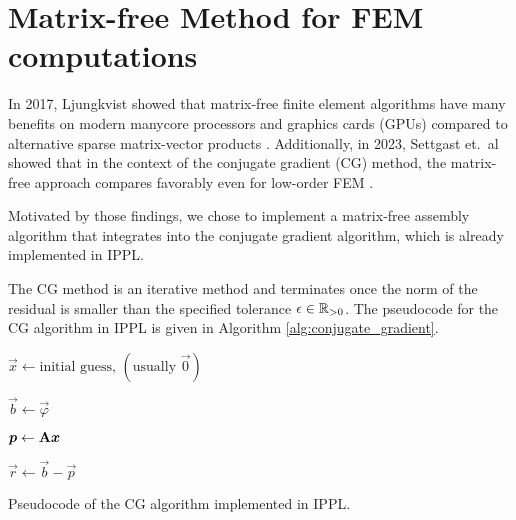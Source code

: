 
\section{Matrix-free Method for FEM computations}

\label{sec:matrix_free}

In 2017, Ljungkvist showed that matrix-free finite element algorithms
have many benefits on modern manycore processors and graphics cards (GPUs)
compared to alternative sparse matrix-vector products \cite{ljungkvist_matrix-free_2017}.
Additionally, in 2023, Settgast et.\ al showed that in the context of the
conjugate gradient (CG) method, the matrix-free approach compares favorably
even for low-order FEM \cite{settgast_performant_2023}.

Motivated by those findings, we chose to implement a matrix-free assembly algorithm that integrates
into the conjugate gradient algorithm, which is already implemented in IPPL.

The CG method is an iterative method and terminates once the norm of the residual is smaller than the specified tolerance $\epsilon \in \mathbb{R}_{>0}$.
The pseudocode for the CG algorithm in IPPL is given in Algorithm \ref{alg:conjugate_gradient}.


\begin{algorithm}[h]

    $\vec{x} \gets \text{initial guess, }(\text{usually }\vec{0})$

    $\vec{b} \gets \vec{\varphi}$

    $\boldsymbol{p} \gets \mathbf{A} \boldsymbol{x}$

    $\vec{r} \gets \vec{b} - \vec{p}$

    \vspace{0.3cm}
    \caption{Pseudocode of the CG algorithm implemented in IPPL.}
    \label{alg:conjugate_gradient}
\end{algorithm}

